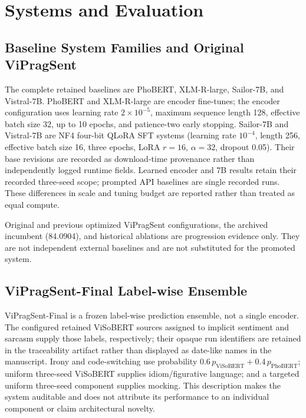 \section{Systems and Evaluation}
\label{sec:systems-evaluation}

\subsection{Baseline System Families and Original ViPragSent}

The complete retained baselines are PhoBERT, XLM-R-large, Sailor-7B, and Vistral-7B. PhoBERT and XLM-R-large are encoder fine-tunes; the encoder configuration uses learning rate $2\times10^{-5}$, maximum sequence length 128, effective batch size 32, up to 10 epochs, and patience-two early stopping. Sailor-7B and Vistral-7B are NF4 four-bit QLoRA SFT systems (learning rate $10^{-4}$, length 256, effective batch size 16, three epochs, LoRA $r=16$, $\alpha=32$, dropout 0.05). Their base revisions are recorded as download-time provenance rather than independently logged runtime fields. Learned encoder and 7B results retain their recorded three-seed scope; prompted API baselines are single recorded runs. These differences in scale and tuning budget are reported rather than treated as equal compute.

Original and previous optimized ViPragSent configurations, the archived incumbent (84.0904), and historical ablations are progression evidence only. They are not independent external baselines and are not substituted for the promoted system.

\subsection{ViPragSent-Final Label-wise Ensemble}

ViPragSent-Final is a frozen label-wise prediction ensemble, not a single encoder. The configured retained ViSoBERT sources assigned to implicit sentiment and sarcasm supply those labels, respectively; their opaque run identifiers are retained in the traceability artifact rather than displayed as date-like names in the manuscript. Irony and code-switching use probability $0.6\,p_{\mathrm{ViSoBERT}}+0.4\,p_{\mathrm{PhoBERT}}$; uniform three-seed ViSoBERT supplies idiom/figurative language; and a targeted uniform three-seed component supplies mocking. This description makes the system auditable and does not attribute its performance to an individual component or claim architectural novelty.

